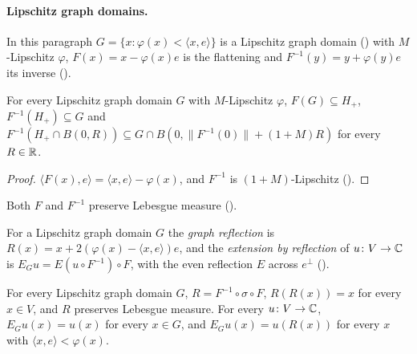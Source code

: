 \paragraph{Lipschitz graph domains.}

In this paragraph $G = \{x : \varphi(x) < \langle x, e \rangle\}$ is a Lipschitz graph domain
() with $M$-Lipschitz $\varphi$, $F(x) = x - \varphi(x) e$ is the
flattening and $F^{-1}(y) = y + \varphi(y) e$ its inverse ().

\begin{lemma}
\label{lem:lipschitz-flattening}
\leanok
{}
For every Lipschitz graph domain $G$ with $M$-Lipschitz $\varphi$, $F(G) \subseteq H_+$,
$F^{-1}(H_+) \subseteq G$ and
$F^{-1}(H_+ \cap B(0, R)) \subseteq G \cap B(0, \|F^{-1}(0)\| + (1 + M) R)$ for every $R \in \mathbb{R}$.
\end{lemma}

\begin{proof}
\leanok
$\langle F(x), e \rangle = \langle x, e \rangle - \varphi(x)$, and $F^{-1}$ is
$(1 + M)$-Lipschitz ().
\end{proof}

Both $F$ and $F^{-1}$ preserve Lebesgue measure ().

\begin{definition}
\label{def:graph-reflection-extension}
\leanok
{}
For a Lipschitz graph domain $G$ the \emph{graph reflection} is
$R(x) = x + 2 (\varphi(x) - \langle x, e \rangle) e$, and the \emph{extension by reflection} of
$u \colon V \to \mathbb{C}$ is $E_G u = E(u \circ F^{-1}) \circ F$, with the even reflection $E$ across
$e^\perp$ ().
\end{definition}

\begin{lemma}
\label{lem:graph-reflection}
\leanok
{}
For every Lipschitz graph domain $G$, $R = F^{-1} \circ \sigma \circ F$, $R(R(x)) = x$ for every
$x \in V$, and $R$ preserves Lebesgue measure. For every $u \colon V \to \mathbb{C}$, $E_G u(x) = u(x)$
for every $x \in G$, and $E_G u(x) = u(R(x))$ for every $x$ with
$\langle x, e \rangle < \varphi(x)$.
\end{lemma}

